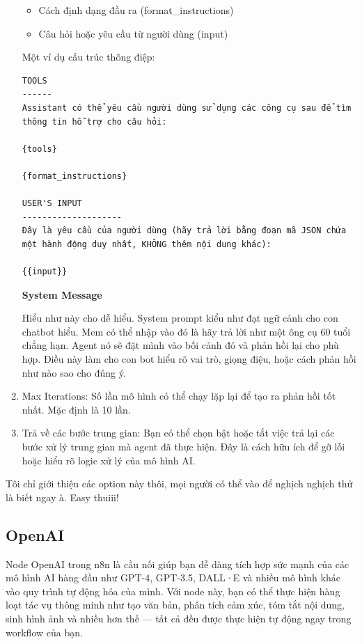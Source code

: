 \begin{enumerate}
\begin{itemize}
    \item Cách định dạng đầu ra ({format\_instructions})

    \item Câu hỏi hoặc yêu cầu từ người dùng ({{input}})

\end{itemize}
Một ví dụ cấu trúc thông điệp:
\begin{verbatim}
TOOLS
------
Assistant có thể yêu cầu người dùng sử dụng các công cụ sau để tìm thông tin hỗ trợ cho câu hỏi:

{tools}

{format_instructions}

USER'S INPUT
--------------------
Đây là yêu cầu của người dùng (hãy trả lời bằng đoạn mã JSON chứa một hành động duy nhất, KHÔNG thêm nội dung khác):

{{input}}
\end{verbatim}

\textbf{System Message}

Hiểu như này cho dễ hiểu. System prompt kiểu như đạt ngữ cảnh cho con chatbot hiểu. Mem có thể nhập vào đó là hãy trả lời như một ông cụ 60 tuổi chẳng hạn. Agent nó sẽ đặt mình vào bối cảnh đó và phản hồi lại cho phù hợp. Điều này làm cho con bot hiểu rõ vai trò, giọng điệu, hoặc cách phản hồi như nào sao cho đúng ý.

    \item Max Iterations: Số lần mô hình có thể chạy lặp lại để tạo ra phản hồi tốt nhất. Mặc định là 10 lần.

    \item Trả về các bước trung gian: Bạn có thể chọn bật hoặc tắt việc trả lại các bước xử lý trung gian mà agent đã thực hiện. Đây là cách hữu ích để gỡ lỗi hoặc hiểu rõ logic xử lý của mô hình AI.
\end{enumerate}


Tôi chỉ giới thiệu các option này thôi, mọi người có thể vào để nghịch nghịch thử là biết ngay à. Easy thuiii!


\subsection{OpenAI}
Node OpenAI trong n8n là cầu nối giúp bạn dễ dàng tích hợp sức mạnh của các mô hình AI hàng đầu như GPT-4, GPT-3.5, DALL·E và nhiều mô hình khác vào quy trình tự động hóa của mình. Với node này, bạn có thể thực hiện hàng loạt tác vụ thông minh như tạo văn bản, phân tích cảm xúc, tóm tắt nội dung, sinh hình ảnh và nhiều hơn thế — tất cả đều được thực hiện tự động ngay trong workflow của bạn.

